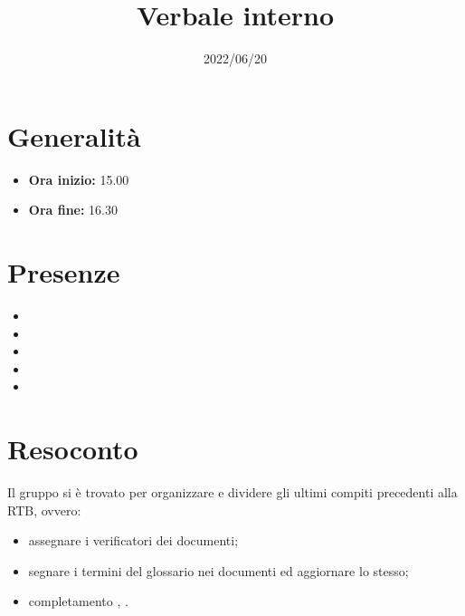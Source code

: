 \documentclass{classes/base}
\title{Verbale interno}
\date{2022/06/20}
\author{\marcob}
\renewcommand{\maketitle}{
    
}
\begin{document}
    \maketitle

    \section*{Generalità}
    \begin{itemize}
        \item \textbf{Ora inizio:} 15.00
        \item \textbf{Ora fine:} 16.30
    \end{itemize}
    
    \section*{Presenze}
    \begin{itemize}
        \item \marcob
        \item \angela
        \item \marcov
        \item \giulio
        \item \matteo
    \end{itemize}

    \section*{Resoconto}
    Il gruppo si è trovato per organizzare e dividere gli ultimi compiti precedenti alla RTB, ovvero:
    \begin{itemize}
        \item assegnare i verificatori dei documenti;
        \item segnare i termini del glossario nei documenti ed aggiornare lo stesso;
        \item completamento \NdP, \PdP.
    \end{itemize}
\end{document}
